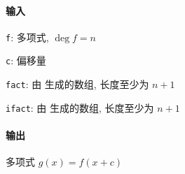 \paragraph{输入}

\verb|f|: 多项式, \(\deg f=n\)

\verb|c|: 偏移量

\verb|fact|: 由  生成的数组, 长度至少为 \(n+1\)

\verb|ifact|: 由  生成的数组, 长度至少为 \(n+1\)

\paragraph{输出}

多项式 \(g(x)=f(x+c)\)
